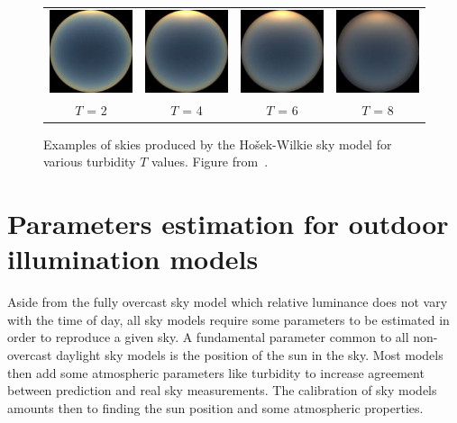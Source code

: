 \begin{figure}
\centering
\begin{tabular}{@{}c@{}c@{}c@{}c@{}}
\includegraphics[width=0.23\linewidth]{3rdparty/hw-004.jpg} &
\includegraphics[width=0.23\linewidth]{3rdparty/hw-005.jpg} &
\includegraphics[width=0.23\linewidth]{3rdparty/hw-006.jpg} &
\includegraphics[width=0.23\linewidth]{3rdparty/hw-007.jpg} \\
$T$ = 2 & $T$ = 4 & $T$ = 6 & $T$ = 8 \\
\end{tabular}
\caption[Examples of skies produced by the Ho\v{s}ek-Wilkie sky model]{Examples of skies produced by the Ho\v{s}ek-Wilkie sky model for various turbidity $T$ values. Figure from~\cite{hosek-siggraph-12}.}
\label{fig:hw_sky_model}
\end{figure}

\section{Parameters estimation for outdoor illumination models}


Aside from the fully overcast sky model which relative luminance does not vary with the time of day, all sky models require some parameters to be estimated in order to reproduce a given sky. A fundamental parameter common to all non-overcast daylight sky models is the position of the sun in the sky. Most models then add some atmospheric parameters like turbidity to increase agreement between prediction and real sky measurements. The calibration of sky models amounts then to finding the sun position and some atmospheric properties. 

